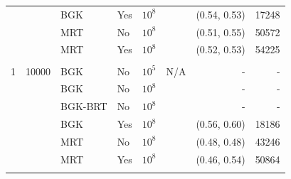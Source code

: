 \begin{table}
\begin{tabulary}{\linewidth}{r r l l r r r r}
  &      & BGK     & Yes & $10^8$ &              & (0.54, 0.53) & 17248 \\
  &      & MRT     & No  & $10^8$ &              & (0.51, 0.55) & 50572 \\
  &      & MRT     & Yes & $10^8$ &              & (0.52, 0.53) & 54225 \\
\\
1 & 10000 & BGK     & No  & $10^5$ & N/A          & - & - \\
  &       & BGK     & No  & $10^8$ &              & - & - \\
  &       & BGK-BRT & No  & $10^8$ &              & - & - \\
  &       & BGK     & Yes & $10^8$ &              & (0.56, 0.60) & 18186 \\
  &       & MRT     & No  & $10^8$ &              & (0.48, 0.48) & 43246 \\
  &       & MRT     & Yes & $10^8$ &              & (0.46, 0.54) & 50864 \\
\\
\end{tabulary}
\label{tab:lid-bing1}
\end{table}
